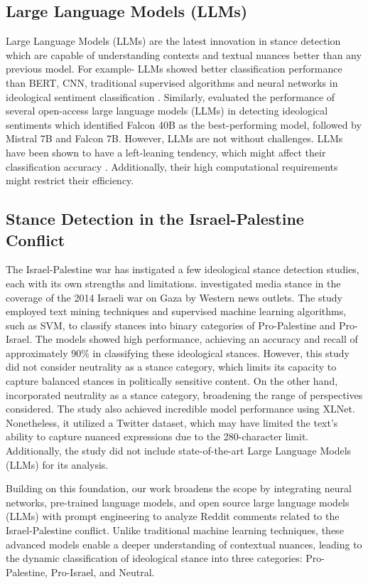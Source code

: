 \subsection*{\textbf{Large Language Models (LLMs)}}
Large Language Models (LLMs) are the latest innovation in stance detection which are capable of understanding contexts and textual nuances better than any previous model. For example- LLMs showed better classification performance than BERT, CNN, traditional supervised algorithms and neural networks in ideological sentiment classification \citep{kwon2024sentiment}. Similarly, \citep{kuila2024deciphering} evaluated the performance of several open-access large language models (LLMs) in detecting ideological sentiments which identified Falcon 40B as the best-performing model, followed by Mistral 7B and Falcon 7B. However, LLMs are not without challenges. LLMs have been shown to have a left-leaning tendency, which might affect their classification accuracy \citep{hernandes2024llms, pit2023whose}. Additionally, their high computational requirements might restrict their efficiency. 

\subsection*{\textbf{Stance Detection in the Israel-Palestine Conflict}}
The Israel-Palestine war has instigated a few ideological stance detection studies, each with its own strengths and limitations. \citep{AlSarraj2018} investigated media stance in the coverage of the 2014 Israeli war on Gaza by Western news outlets. The study employed text mining techniques and supervised machine learning algorithms, such as SVM, to classify stances into binary categories of Pro-Palestine and Pro-Israel. The models showed high performance, achieving an accuracy and recall of approximately 90\% in classifying these ideological stances. However, this study did not consider neutrality as a stance category, which limits its capacity to capture balanced stances in politically sensitive content. On the other hand, \citep{imtiaz2022takingsidespublicopinion} incorporated neutrality as a stance category, broadening the range of perspectives considered. The study also achieved incredible model performance using XLNet. Nonetheless, it utilized a Twitter dataset, which may have limited the text's ability to capture nuanced expressions due to the 280-character limit. Additionally, the study did not include state-of-the-art Large Language Models (LLMs) for its analysis.

Building on this foundation, our work broadens the scope by integrating neural networks, pre-trained language models, and open source large language models (LLMs) with prompt engineering to analyze Reddit comments related to the Israel-Palestine conflict. Unlike traditional machine learning techniques, these advanced models enable a deeper understanding of contextual nuances, leading to the dynamic classification of ideological stance into three categories: Pro-Palestine, Pro-Israel, and Neutral.